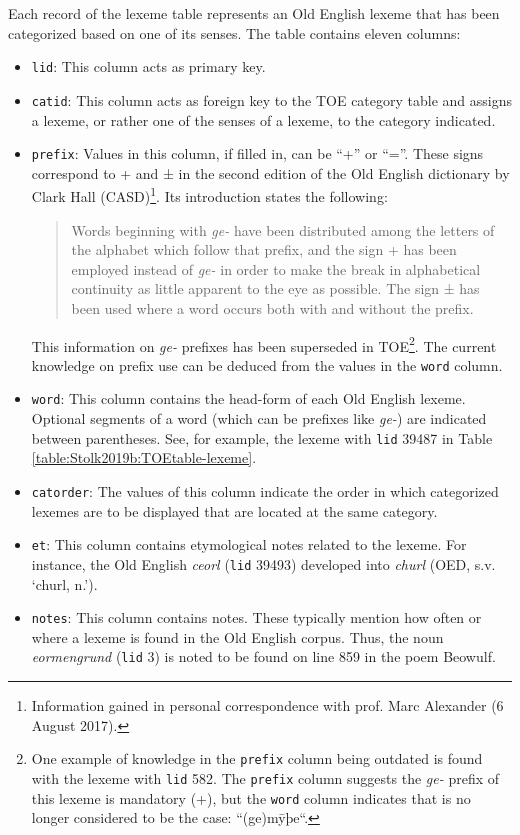 Each record of the lexeme table represents an Old English lexeme that has been categorized based on one of its senses. The table contains eleven columns:
\begin{itemize}
\item \texttt{lid}: This column acts as primary key.
\item \texttt{catid}: This column acts as foreign key to the TOE category table and assigns a lexeme, or rather one of the senses of a lexeme, to the category indicated.
\item \texttt{prefix}: Values in this column, if filled in, can be “+” or “=”. These signs correspond to + and ± in the second edition of the Old English dictionary by Clark Hall (CASD)\footnote{Information gained in personal correspondence with prof. Marc Alexander (6 August 2017).}. Its introduction states the following:
\begin{quote}
Words beginning with \textit{ge-} have been distributed among the letters of the alphabet which follow that prefix, and the sign + has been employed instead of \textit{ge-} in order to make the break in alphabetical continuity as little apparent to the eye as possible. The sign ± has been used where a word occurs both with and without the prefix.
\end{quote}
This information on \textit{ge-} prefixes has been superseded in TOE\footnote{One example of knowledge in the \texttt{prefix} column being outdated is found with the lexeme with \texttt{lid} 582. The \texttt{prefix} column suggests the \textit{ge-} prefix of this lexeme is mandatory (+), but the \texttt{word} column indicates that is no longer considered to be the case: “(ge)mȳþe“.}. The current knowledge on prefix use can be deduced from the values in the \texttt{word} column.
\item \texttt{word}: This column contains the head-form of each Old English lexeme. Optional segments of a word (which can be prefixes like \textit{ge-}) are indicated between parentheses. See, for example, the lexeme with \texttt{lid} 39487 in Table \ref{table:Stolk2019b:TOEtable-lexeme}.
\item \texttt{catorder}: The values of this column indicate the order in which categorized lexemes are to be displayed that are located at the same category.
\item \texttt{et}: This column contains etymological notes related to the lexeme. For instance, the Old English \textit{ceorl} (\texttt{lid} 39493) developed into \textit{churl} (OED, s.v. ‘churl, n.’). 
\item \texttt{notes}: This column contains notes. These typically mention how often or where a lexeme is found in the Old English corpus. Thus, the noun \textit{eormengrund} (\texttt{lid} 3) is noted to be found on line 859 in the poem Beowulf.

\end{itemize}
